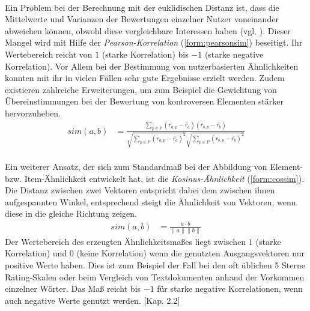 \paragraph{} Ein Problem bei der Berechnung mit der euklidischen Distanz ist, dass die Mittelwerte und Varianzen der Bewertungen einzelner Nutzer voneinander abweichen können, obwohl diese vergleichbare Interessen haben (vgl. \citep[Kap. 2]{pci}). Dieser Mangel wird mit Hilfe der \textit{Pearson-Korrelation} (\ref{form:pearsonsim}) beseitigt.  Ihr Wertebereich reicht von $1$ (starke Korrelation) bis $-1$ (starke negative Korrelation). Vor Allem bei der Bestimmung von nutzerbasierten Ähnlichkeiten konnten mit ihr in vielen Fällen sehr gute Ergebnisse erzielt werden. Zudem existieren zahlreiche Erweiterungen, um zum Beispiel die Gewichtung von Übereinstimmungen bei der Bewertung von kontroversen Elementen stärker hervorzuheben. \citep[Kap. 2.1]{rs} \citep{hb_02}
\begin{align}
\label{form:pearsonsim}
sim(a,b) & = \frac{\sum_{p \in P} (r_{a,p}-\bar{r_a})(r_{b,p}-\bar{r_b})}{\sqrt{\sum_{p \in P} (r_{a,p}-\bar{r_a})^2 }\sqrt{\sum_{p \in P} (r_{b,p}-\bar{r_b})^2 }}
\end{align}

\paragraph{}\label{sec:cossim} Ein weiterer Ansatz, der sich zum Standardmaß bei der Abbildung von Element- bzw. Item-Ähnlichkeit entwickelt hat, ist die \textit{Kosinus-Ähnlichkeit} (\ref{form:cossim}). Die Distanz zwischen zwei Vektoren entspricht dabei dem zwischen ihnen aufgespannten Winkel, entsprechend steigt die Ähnlichkeit von Vektoren, wenn diese in die gleiche Richtung zeigen. 
\begin{align}
\label{form:cossim}
sim(a,b) & = \frac{a \cdot b}{\|a\| \|b\|}
\end{align}
Der Wertebereich des erzeugten Ähnlichkeitsmaßes liegt zwischen $1$ (starke Korrelation) und $0$ (keine Korrelation) wenn die genutzten Ausgangsvektoren nur positive Werte haben. Dies ist zum Beispiel der Fall bei den oft üblichen 5 Sterne Rating-Skalen oder beim Vergleich von Textdokumenten anhand der Vorkommen einzelner Wörter. Das Maß reicht bis $-1$ für starke negative Korrelationen, wenn auch negative Werte genutzt werden. \citep{rs}[Kap. 2.2]

